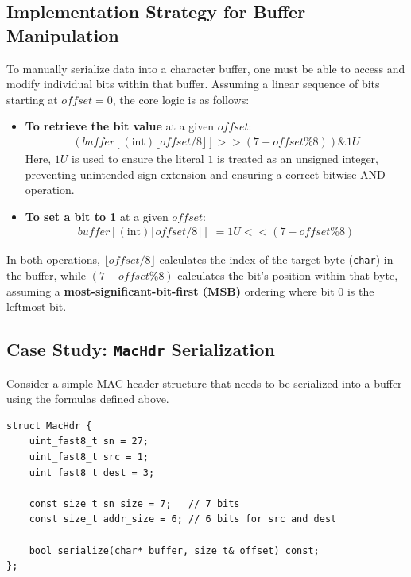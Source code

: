 \documentclass{article}
\begin{document}
\subsection{Implementation Strategy for Buffer Manipulation}

To manually serialize data into a character buffer, one must be able to access and modify individual bits within that buffer. Assuming a linear sequence of bits starting at $offset = 0$, the core logic is as follows:

\begin{itemize}
    \item \textbf{To retrieve the bit value} at a given $offset$:
    \begin{align*}
        (buffer[(\text{int})\lfloor offset/8 \rfloor] >> (7-offset\%8)) \& 1U
    \end{align*}
    Here, $1U$ is used to ensure the literal $1$ is treated as an unsigned integer, preventing unintended sign extension and ensuring a correct bitwise AND operation.
    \item \textbf{To set a bit to 1} at a given $offset$:
    \begin{align*}
        buffer[(\text{int})\lfloor offset/8 \rfloor] |= 1U << (7-offset\%8)
    \end{align*}
\end{itemize}

In both operations, $\lfloor offset/8 \rfloor$ calculates the index of the target byte (\texttt{char}) in the buffer, while $(7-offset\%8)$ calculates the bit's position within that byte, assuming a \textbf{most-significant-bit-first (MSB)} ordering where bit $0$ is the leftmost bit.

\subsection[Case Study: MacHdr Serialization]{Case Study: \texttt{MacHdr} Serialization}

Consider a simple MAC header structure that needs to be serialized into a buffer using the formulas defined above.

\begin{center}
\begin{verbatim}
struct MacHdr {
    uint_fast8_t sn = 27;
    uint_fast8_t src = 1;
    uint_fast8_t dest = 3;

    const size_t sn_size = 7;   // 7 bits
    const size_t addr_size = 6; // 6 bits for src and dest

    bool serialize(char* buffer, size_t& offset) const;
};
\end{verbatim}
\end{center}
\end{document}
